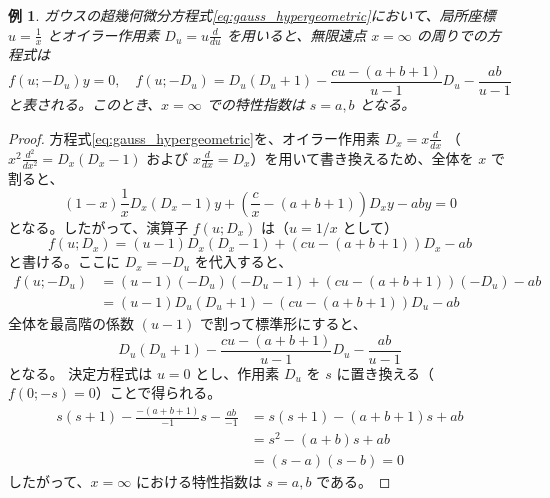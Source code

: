 \documentclass[paper=a4, fontsize=11pt]{jlreq} %
\theoremstyle{break}
\newtheorem{example}[theorem]{例}
\theoremstyle{qa}
\theoremstyle{remark} %
\begin{document}
\begin{example}
ガウスの超幾何微分方程式\eqref{eq:gauss_hypergeometric}において、局所座標 $u=\frac{1}{x}$ とオイラー作用素 $D_{u} = u\frac{d}{du}$ を用いると、無限遠点 $x=\infty$ の周りでの方程式は
\[
f(u; -D_{u})y = 0, \quad f(u; -D_{u}) = D_{u}(D_{u}+1) - \frac{cu-(a+b+1)}{u-1}D_{u} - \frac{ab}{u-1}
\]
と表される。このとき、$x=\infty$ での特性指数は $s=a, b$ となる。
\end{example}

\begin{proof}
方程式\eqref{eq:gauss_hypergeometric}を、オイラー作用素 $D_{x} = x\frac{d}{dx}$ （$x^{2}\frac{d^{2}}{dx^{2}} = D_{x}(D_{x}-1)$ および $x\frac{d}{dx} = D_{x}$）を用いて書き換えるため、全体を $x$ で割ると、
\[
(1-x) \frac{1}{x} D_{x}(D_{x}-1)y + \left( \frac{c}{x} - (a+b+1) \right) D_{x}y - aby = 0
\]
となる。したがって、演算子 $f(u; D_{x})$ は（$u=1/x$ として）
\[
f(u; D_{x}) = (u-1)D_{x}(D_{x}-1) + (cu-(a+b+1))D_{x} - ab
\]
と書ける。ここに $D_{x} = -D_{u}$ を代入すると、
\begin{align*}
f(u; -D_{u}) &= (u-1)(-D_{u})(-D_{u}-1) + (cu-(a+b+1))(-D_{u}) - ab \\
&= (u-1)D_{u}(D_{u}+1) - (cu-(a+b+1))D_{u} - ab
\end{align*}
全体を最高階の係数 $(u-1)$ で割って標準形にすると、
\[
D_{u}(D_{u}+1) - \frac{cu-(a+b+1)}{u-1}D_{u} - \frac{ab}{u-1}
\]
となる。
決定方程式は $u=0$ とし、作用素 $D_{u}$ を $s$ に置き換える（$f(0; -s) = 0$）ことで得られる。
\begin{align*}
s(s+1) - \frac{-(a+b+1)}{-1}s - \frac{ab}{-1} &= s(s+1) - (a+b+1)s + ab \\
&= s^{2} - (a+b)s + ab \\
&= (s-a)(s-b) = 0
\end{align*}
したがって、$x=\infty$ における特性指数は $s=a, b$ である。
\end{proof}
\end{document}
